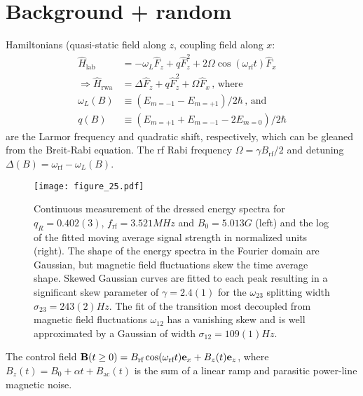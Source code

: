\documentclass[aps,prl,reprint,superscriptaddress,floatfix]{revtex4-1}
\begin{document}
\section{Background + random}
\label{sec:background}
Hamiltonians (quasi-static field along $z$, coupling field along $x$:
    \begin{align*}
        \hat{H}_{\text{lab}} &= -\omega_L \hat{F}_z + q \hat{F}_z^2 + 2\Omega \cos (\omega_{\text{rf}} t) \hat{F}_x \\
        \Rightarrow \hat{H}_{\text{rwa}} &= \Delta \hat{F}_z + q \hat{F}_z^2 + \Omega \hat{F}_x \, \text{, where} \\
        \omega_L(B) &\equiv (E_{m=-1} - E_{m=+1})/2\hbar \, \text{, and} \\
        q(B) &\equiv (E_{m=+1} + E_{m=-1} - 2 E_{m=0})/2\hbar
    \end{align*}
    are the Larmor frequency and quadratic shift, respectively, which can be gleaned from the Breit-Rabi equation.
    The rf Rabi frequency $\Omega = \gamma B_{\text{rf}}/2$ and detuning $\Delta(B) = \omega_{\text{rf}} - \omega_L(B)$.
\begin{figure}
    \centering
    \texttt{[image: figure\_25.pdf]}
    \caption{
    \label{fig:dressed_peaks}
    Continuous measurement of the dressed energy spectra for $q_R = 0.402(3)$, $f_{\text{rf}}=3.521\unit{MHz}$ and $B_0=5.013\unit{G}$ (left) and the log of the fitted moving average signal strength in normalized units (right). 
    The shape of the energy spectra in the Fourier domain are Gaussian, but magnetic field fluctuations skew the time average shape.  
    Skewed Gaussian curves are fitted to each peak resulting in a significant skew parameter of $\gamma = 2.4(1)$ for the $\omega_{23}$ splitting width $\sigma_{23} = 243(2)\unit{Hz}$. 
    The fit of the transition most decoupled from magnetic field fluctuations $\omega_{12}$ has a vanishing skew and is well approximated by a Gaussian of width $\sigma_{12} = 109(1)\unit{Hz}$.
    }
\end{figure}

The control field $\mathbf{B}(t \geq 0) = B_{\text{rf}} \cos (\omega_{\text{rf}} t) \mathbf{e}_x + B_z(t) \mathbf{e}_z$, where $B_z(t) = B_0 + \alpha t + B_{\text{ac}}(t)$ is the sum of a linear ramp and parasitic power-line magnetic noise.
\end{document}
